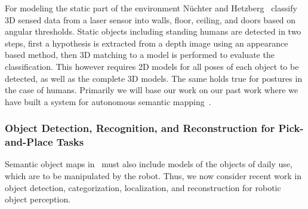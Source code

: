 
For modeling the static part of the environment N\"uchter and
Hetzberg~\cite{nuechter08semanticmaps} classify 3D sensed data from a
laser sensor into walls, floor, ceiling, and doors based on angular
thresholds. Static objects including standing humans are detected
in two steps, first a hypothesis is extracted from a depth image
using an appearance based method, then 3D matching to a model is
performed to evaluate the classification. This however requires 2D
models for all poses of each object to be detected, as well as the
complete 3D models. The same holds true for postures in the case of humans.
Primarily we will base our work on our past work where we have built a
system for autonomous semantic mapping~\cite{mapping11iros}.
\subsubsection{Object Detection, Recognition, and Reconstruction for Pick-and-Place Tasks}
\label{sec:objects}
Semantic object maps in \ksem\ must also include models of the objects of daily use, which
are to be manipulated by the robot. Thus, we now consider recent
work in object detection, categorization, localization, and
reconstruction for robotic object perception.



